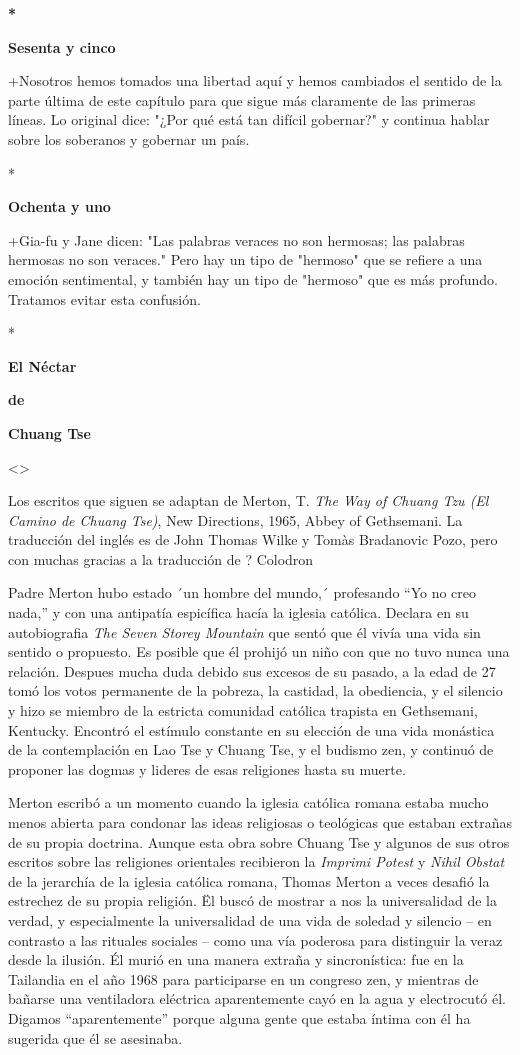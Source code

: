\textbf{*}

\textbf{Sesenta y cinco}

+Nosotros hemos tomados una libertad aquí y hemos cambiados el sentido
de la parte última de este capítulo para que sigue más claramente de las
primeras líneas. Lo original dice: "¿Por qué está tan difícil gobernar?"
y continua hablar sobre los soberanos y gobernar un país.

*

\textbf{Ochenta y uno}

+Gia-fu y Jane dicen: "Las palabras veraces no son hermosas; las
palabras hermosas no son veraces." Pero hay un tipo de "hermoso" que se
refiere a una emoción sentimental, y también hay un tipo de "hermoso"
que es más profundo. Tratamos evitar esta confusión.

*

\textbf{El Néctar}

\textbf{de}

\textbf{Chuang Tse}

\textless\textgreater{}

Los escritos que siguen se adaptan de Merton, T. \emph{The Way of Chuang
Tzu (El Camino de Chuang Tse)}, New Directions, 1965, Abbey of
Gethsemani. La traducción del inglés es de John Thomas Wilke y Tomàs
Bradanovic Pozo, pero con muchas gracias a la traducción de ? Colodron

Padre Merton hubo estado ´un hombre del mundo,´ profesando ``Yo no creo
nada,'' y con una antipatía espicífica hacía la iglesia católica.
Declara en su autobiografia \emph{The Seven Storey Mountain} que sentó
que él vivía una vida sin sentido o propuesto. Es posible que él prohijó
un niño con que no tuvo nunca una relación. Despues mucha duda debido
sus excesos de su pasado, a la edad de 27 tomó los votos permanente de
la pobreza, la castidad, la obediencia, y el silencio y hizo se miembro
de la estricta comunidad católica trapista en Gethsemani, Kentucky.
Encontró el estímulo constante en su elección de una vida monástica de
la contemplación en Lao Tse y Chuang Tse, y el budismo zen, y continuó
de proponer las dogmas y lideres de esas religiones hasta su muerte.

Merton escribó a un momento cuando la iglesia católica romana estaba
mucho menos abierta para condonar las ideas religiosas o teológicas que
estaban extrañas de su propia doctrina. Aunque esta obra sobre Chuang
Tse y algunos de sus otros escritos sobre las religiones orientales
recibieron la \emph{Imprimi Potest} y \emph{Nihil Obstat} de la
jerarchía de la iglesia católica romana, Thomas Merton a veces desafió
la estrechez de su propia religión. Ël buscó de mostrar a nos la
universalidad de la verdad, y especialmente la universalidad de una vida
de soledad y silencio -- en contrasto a las rituales sociales -- como
una vía poderosa para distinguir la veraz desde la ilusión. Él murió en
una manera extraña y sincronística: fue en la Tailandia en el año 1968
para participarse en un congreso zen, y mientras de bañarse una
ventiladora eléctrica aparentemente cayó en la agua y electrocutó él.
Digamos ``aparentemente'' porque alguna gente que estaba íntima con él
ha sugerida que él se asesinaba.

